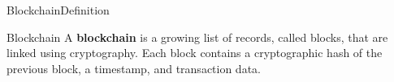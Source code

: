 \begin{frame}{Blockchain}{Definition}
    \begin{block}{Blockchain}
        A \textbf{blockchain} is a growing list of records, called blocks, that are linked using cryptography. Each block contains a cryptographic
        hash of the previous block, a timestamp, and transaction data.
    \end{block}
    \begin{columns}
    \end{columns}
\end{frame}
